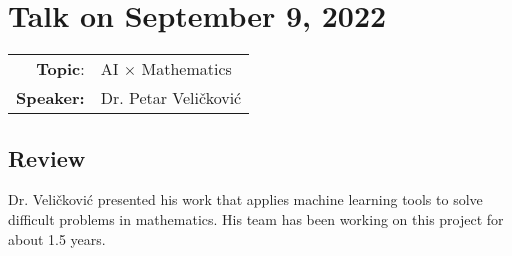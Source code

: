\documentclass[11pt, oneside]{article}   	%
\begin{document}
%
%
%
%
%
%

%
%
%
%
%
%
%
%
%
%
%

%
%
%
%
 



\newpage
\section{Talk on September 9, 2022}
\begin{tabularx} {\textwidth}{r X}
\textbf{Topic}: & AI $\times$ Mathematics \\
\textbf{Speaker:} & Dr. Petar Veličković\\
\end{tabularx}

\subsection{Review}
Dr. Veličković presented his work that applies machine learning tools
to solve difficult problems in mathematics. His team has been working
on this project for about 1.5 years.
\end{document}
